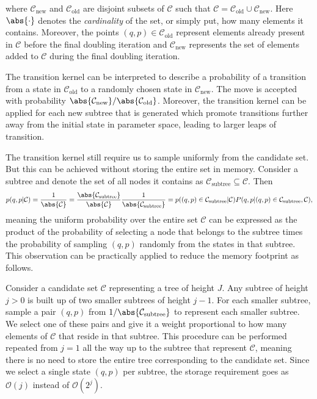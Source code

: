 where $\mathcal{C}_\text{new}$ and $\mathcal{C}_\text{old}$ are disjoint subsets of $\mathcal{C}$ such that $\mathcal{C} = \mathcal{C}_\text{old} \cup \mathcal{C}_\text{new}$. Here $\abs{\cdot}$ denotes the \textit{cardinality} of the set, or simply put, how many elements it contains.
Moreover, the points $(q,p) \in \mathcal{C}_\text{old}$ represent elements already present in $\mathcal{C}$ before the final doubling iteration 
and $\mathcal{C}_\text{new}$ represents the set of elements added to $\mathcal{C}$ during the final doubling iteration. 
\begin{comment}
    The transition accounts for the case when $\mathcal{C}_\text{old}$ is empty, which produces the same transition kernel we have discussed in the naive implementation.
    It also accounts for the case where the new set is empty.
\end{comment}
The transition kernel can be interpreted to describe a probability of a transition from a state in $\mathcal{C}_\text{old}$ to a randomly chosen state in $\mathcal{C}_\text{new}$.
The move is accepted with probability $\abs{\mathcal{C}_\text{new}} / \abs{\mathcal{C}_\text{old}}$. Moreover, the transition kernel can be applied
for each new subtree that is generated which promote transitions further away from the initial state in parameter space, leading to larger leaps of transition.

The transition kernel still require us to sample uniformly from the candidate set. But this can be achieved without storing the entire set in memory. Consider a subtree and denote the set of all nodes it contains as $\mathcal{C}_\text{subtree} \subseteq \mathcal{C}$. 
Then
\begin{equation}
    p(q, p|\mathcal{C}) = \frac{1}{\abs{\mathcal{C}}} = \frac{\abs{\mathcal{C}_\text{subtree}}}{\abs{\mathcal{C}}} \frac{1}{\abs{\mathcal{C}_\text{subtree}}} 
    = p((q, p) \in \mathcal{C}_\text{subtree}|\mathcal{C})P(q,p |(q,p) \in \mathcal{C}_\text{subtree}, \mathcal{C}),
\end{equation}
meaning the uniform probability over the entire set $\mathcal{C}$ can be expressed as the product of the probability of selecting a node that belongs to the subtree times the probability of sampling $(q, p)$ randomly from the states in that subtree. This observation can be practically applied to reduce the memory footprint as follows. 

Consider a candidate set $\mathcal{C}$ representing a tree of height $J$. Any subtree of height $j > 0$ is built up of two smaller subtrees of height $j - 1$.  
For each smaller subtree, sample a pair $(q, p)$ from $1 / \abs{\mathcal{C}_\text{subtree}}$ to represent each smaller subtree. We select one of these pairs and give it a weight proportional to how many elements of $\mathcal{C}$ that reside in that subtree. This procedure can be performed repeated from $j = 1$ all the way up to the subtree that represent $\mathcal{C}$, meaning there is no need to store the entire tree corresponding to the candidate set. Since we select a single state $(q, p)$ per subtree, the storage requirement goes as $\mathcal{O}(j)$ instead of $\mathcal{O}(2^j)$. 


